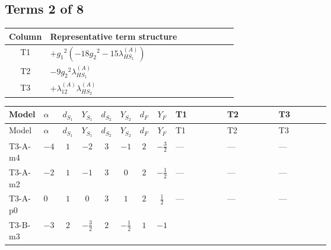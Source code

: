 \documentclass[8pt]{article}
\begin{document}
\begin{landscape}
\subsection*{Terms 2 of 8}
\begin{center}
\begin{tabular}{@{}c >{\raggedright\arraybackslash}p{0.82\linewidth}@{}}
\toprule
Column & Representative term structure \\
\midrule
T1 & \(\displaystyle +{g_1}^2 \left(-18 {g_2}^2-15 {\lambda_{HS_1}^{(A)}}\right)\) \\
\midrule
T2 & \(\displaystyle -9 {g_2}^2 {\lambda_{HS_1}^{(A)}}\) \\
\midrule
T3 & \(\displaystyle +{\lambda_{12}^{(A)}} {\lambda_{HS_2}^{(A)}}\) \\
\midrule
\bottomrule
\end{tabular}
\end{center}
\smallskip
\tiny
\begin{longtable}{@{}llcccccc >{\raggedright\arraybackslash}p{0.21\linewidth} >{\raggedright\arraybackslash}p{0.21\linewidth} >{\raggedright\arraybackslash}p{0.21\linewidth}@{}}
\toprule
Model & $\alpha$ & $d_{S_1}$ & $Y_{S_1}$ & $d_{S_2}$ & $Y_{S_2}$ & $d_F$ & $Y_F$ & T1 & T2 & T3 \\
\midrule
\endfirsthead
\toprule
Model & $\alpha$ & $d_{S_1}$ & $Y_{S_1}$ & $d_{S_2}$ & $Y_{S_2}$ & $d_F$ & $Y_F$ & T1 & T2 & T3 \\
\midrule
\endhead
T3-A-m4 & $-4$ & $1$ & $-2$ & $3$ & $-1$ & $2$ & $-\frac{3}{2}$ & --- & --- & --- \\
\midrule
T3-A-m2 & $-2$ & $1$ & $-1$ & $3$ & $0$ & $2$ & $-\frac{1}{2}$ & --- & --- & --- \\
\midrule
T3-A-p0 & $0$ & $1$ & $0$ & $3$ & $1$ & $2$ & $\frac{1}{2}$ & --- & --- & --- \\
\midrule
T3-B-m3 & $-3$ & $2$ & $-\frac{3}{2}$ & $2$ & $-\frac{1}{2}$ & $1$ & $-1$ & \scriptsize\adjustbox{max width=\linewidth}{$\begin{gathered} +{g_1}^2 \left(-18 {g_2}^2-15 {\lambda_{HS_1}^{(A)}}\right)\end{gathered}$} & \scriptsize\adjustbox{max width=\linewidth}{$\begin{gathered} -9 {g_2}^2 {\lambda_{HS_1}^{(A)}}\end{gathered}$} & \scriptsize\adjustbox{max width=\linewidth}{$\begin{gathered} +{\lambda_{12}^{(A)}} {\lambda_{HS_2}^{(A)}}\end{gathered}$} \\

\end{longtable}
\end{landscape}
\end{document}
